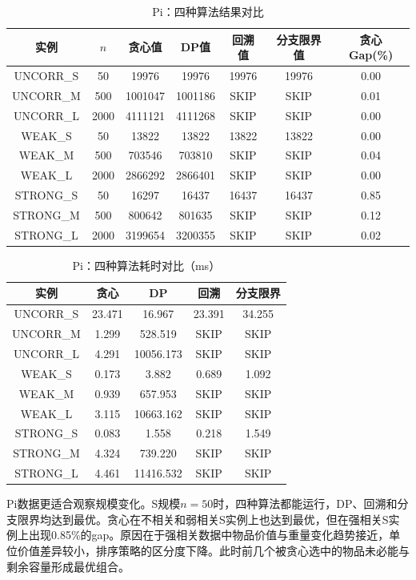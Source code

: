 \documentclass[10.5pt,a4paper,fontset=none]{ctexart}
\begin{document}
\begin{table}[!htbp]
\centering
\footnotesize
\caption{Pi：四种算法结果对比}
\begin{tabular}{ccccccc}
\toprule
实例 & $n$ & 贪心值 & DP值 & 回溯值 & 分支限界值 & 贪心Gap(\%) \\
\midrule
UNCORR\_S & 50 & 19976 & 19976 & 19976 & 19976 & 0.00 \\
UNCORR\_M & 500 & 1001047 & 1001186 & SKIP & SKIP & 0.01 \\
UNCORR\_L & 2000 & 4111121 & 4111268 & SKIP & SKIP & 0.00 \\
WEAK\_S & 50 & 13822 & 13822 & 13822 & 13822 & 0.00 \\
WEAK\_M & 500 & 703546 & 703810 & SKIP & SKIP & 0.04 \\
WEAK\_L & 2000 & 2866292 & 2866401 & SKIP & SKIP & 0.00 \\
STRONG\_S & 50 & 16297 & 16437 & 16437 & 16437 & 0.85 \\
STRONG\_M & 500 & 800642 & 801635 & SKIP & SKIP & 0.12 \\
STRONG\_L & 2000 & 3199654 & 3200355 & SKIP & SKIP & 0.02 \\
\bottomrule
\end{tabular}
\end{table}

\begin{table}[!htbp]
\centering
\footnotesize
\caption{Pi：四种算法耗时对比（ms）}
\begin{tabular}{ccccc}
\toprule
实例 & 贪心 & DP & 回溯 & 分支限界 \\
\midrule
UNCORR\_S & 23.471 & 16.967 & 23.391 & 34.255 \\
UNCORR\_M & 1.299 & 528.519 & SKIP & SKIP \\
UNCORR\_L & 4.291 & 10056.173 & SKIP & SKIP \\
WEAK\_S & 0.173 & 3.882 & 0.689 & 1.092 \\
WEAK\_M & 0.939 & 657.953 & SKIP & SKIP \\
WEAK\_L & 3.115 & 10663.162 & SKIP & SKIP \\
STRONG\_S & 0.083 & 1.558 & 0.218 & 1.549 \\
STRONG\_M & 4.324 & 739.220 & SKIP & SKIP \\
STRONG\_L & 4.461 & 11416.532 & SKIP & SKIP \\
\bottomrule
\end{tabular}
\end{table}

Pi数据更适合观察规模变化。S规模$n=50$时，四种算法都能运行，DP、回溯和分支限界均达到最优。贪心在不相关和弱相关S实例上也达到最优，但在强相关S实例上出现0.85\%的gap。原因在于强相关数据中物品价值与重量变化趋势接近，单位价值差异较小，排序策略的区分度下降。此时前几个被贪心选中的物品未必能与剩余容量形成最优组合。
\end{document}
